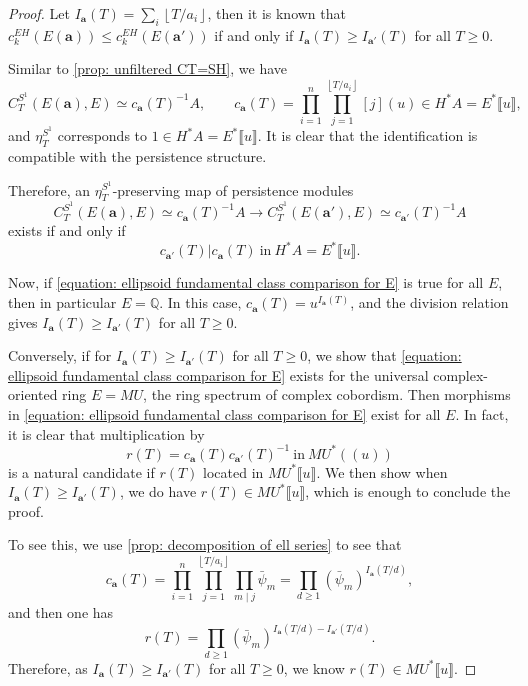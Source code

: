 \documentclass[11pt]{amsart}
\numberwithin{equation}{section}
\theoremstyle{plain}
\theoremstyle{definition}
\theoremstyle{remark}
\newcommand{\bQ} { {\mathbb{Q}}}
\newcommand{\fpw}[1]{{\llbracket #1\rrbracket}}
\newcommand{\fls}[1]{{(\!(#1 )\!) }}
\def\lf{\left\lfloor}
\def\rf{\right\rfloor}
\begin{document}
\begin{proof}Let $I_\mathbf{a}(T)=\sum_i \lf T/a_i\rf$, then it is known that $c_k^{EH}(E(\mathbf{a}))\leq c_k^{EH}(E(\mathbf{a'}))$ if and only if $I_\mathbf{a}(T)\geq I_\mathbf{a'}(T)$ for all $T\geq 0$. 

Similar to \autoref{prop: unfiltered CT=SH}, we have 
\[C^{S^1}_T(E(\mathbf{a}),E)\simeq c_{\mathbf{a}}(T)^{-1}A,\qquad c_{\mathbf{a}}(T)=\prod_{i=1}^{n}\prod_{j=1}^{\lf T/a_i\rf}[j](u)\in H^*A=E^*\fpw{u} ,\]
and $\eta_T^{S^1}$ corresponds to $1\in H^*A=E^*\fpw{u}$. It is clear that the identification is compatible with the persistence structure.

Therefore,  an $\eta_T^{S^1}$-preserving map of persistence modules
\begin{equation}\label{equation: ellipsoid fundamental class comparison for E}
C^{S^1}_T(E(\mathbf{a}),E)\simeq c_{\mathbf{a}}(T)^{-1}A \to C^{S^1}_T(E(\mathbf{a'}),E)\simeq c_{\mathbf{a'}}(T)^{-1}A
\end{equation}
exists if and only if
\[c_{\mathbf{a'}}(T)|c_{\mathbf{a}}(T)~\text{in} ~H^*A=E^*\fpw{u}.\]

Now, if \autoref{equation: ellipsoid fundamental class comparison for E} is true for all $E$, then in particular $E=\bQ$. In this case, $c_{\mathbf{a}}(T)=u^{I_{\mathbf{a}}(T)}$, and the division relation gives $I_\mathbf{a}(T)\geq I_\mathbf{a'}(T)$ for all $T\geq 0$.

Conversely, if for $I_\mathbf{a}(T)\geq I_\mathbf{a'}(T)$ for all $T\geq 0$, we show that \autoref{equation: ellipsoid fundamental class comparison for E} exists for the universal complex-oriented ring $E=MU$, the ring spectrum of complex cobordism. Then morphisms in \autoref{equation: ellipsoid fundamental class comparison for E} exist for all $E$. In fact, it is clear that multiplication by
\[r(T)=c_{\mathbf{a}}(T) c_{\mathbf{a'}}(T)^{-1}~\text{in} ~ MU^*\fls{u}\]
is a natural candidate if $r(T)$ located in $MU^*\fpw{u}$. We then show when $I_\mathbf{a}(T)\geq I_\mathbf{a'}(T)$, we do have $r(T)\in MU^*\fpw{u}$, which is enough to conclude the proof. 

To see this, we use \autoref{prop: decomposition of ell series} to see that 
\[c_{\mathbf{a}}(T)=\prod_{i=1}^{n}\prod_{j=1}^{\lf T/a_i\rf}\prod_{m\mid j}\bar{\psi}_m=\prod_{d\geq 1 }(\bar{\psi}_m)^{I_\mathbf{a}(T/d)},\]
and then one has
\[r(T)=\prod_{d\geq 1 }(\bar{\psi}_m)^{I_\mathbf{a}(T/d)- I_\mathbf{a'}(T/d)}.\]
Therefore, as $I_\mathbf{a}(T)\geq I_\mathbf{a'}(T)$ for all $T\geq 0$, we know $r(T)\in MU^*\fpw{u}$.
\end{proof}
 
\end{document}
